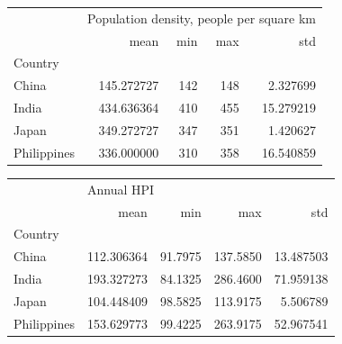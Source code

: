 \documentclass[11pt]{article}
\begin{document}
\begin{flushleft}
\vspace{2em}

\begin{tabular}{lrrrr}
\toprule
{} & \multicolumn{4}{l}{Population density, people per square km} \\
{} &                                     mean &  min &  max &        std \\
Country     &                                          &      &      &            \\
\midrule
China       &                               145.272727 &  142 &  148 &   2.327699 \\
India       &                               434.636364 &  410 &  455 &  15.279219 \\
Japan       &                               349.272727 &  347 &  351 &   1.420627 \\
Philippines &                               336.000000 &  310 &  358 &  16.540859 \\
\bottomrule
\end{tabular}

\vspace{2em}

\begin{tabular}{lrrrr}
\toprule
{} & \multicolumn{4}{l}{Annual HPI} \\
{} &        mean &      min &       max &        std \\
Country     &             &          &           &            \\
\midrule
China       &  112.306364 &  91.7975 &  137.5850 &  13.487503 \\
India       &  193.327273 &  84.1325 &  286.4600 &  71.959138 \\
Japan       &  104.448409 &  98.5825 &  113.9175 &   5.506789 \\
Philippines &  153.629773 &  99.4225 &  263.9175 &  52.967541 \\
\bottomrule
\end{tabular}
\end{flushleft}
\end{document}
